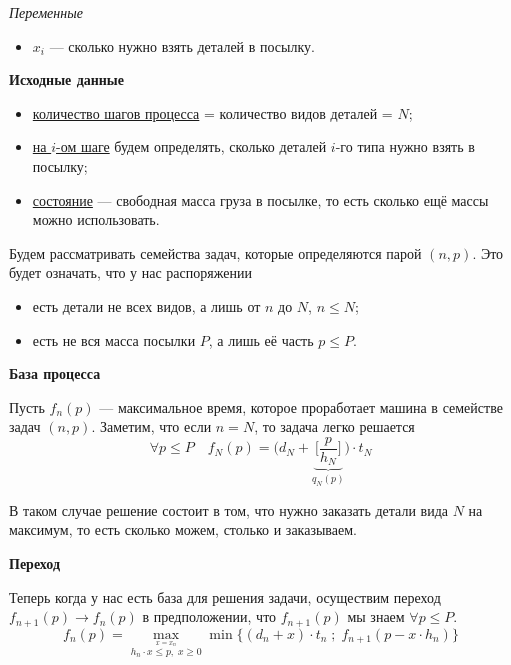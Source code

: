 \bigskip

\textit{Переменные}

\begin{itemize}[nosep]	
	\item $x_i$ --- сколько нужно взять деталей в посылку.
\end{itemize}

\bigskip

\textbf{Исходные данные}

\begin{itemize}[nosep]
	\item \underline{количество шагов процесса} = количество видов деталей = $N$;
	
	\item \underline{на $i$-ом шаге} будем определять, сколько деталей $i$-го типа нужно взять в посылку;
	
	\item \underline{состояние} --- свободная масса груза в посылке, то есть сколько ещё массы можно использовать.
\end{itemize}

Будем рассматривать семейства задач, которые определяются парой $(n, p)$. Это будет означать, что у нас распоряжении
\begin{itemize}[nosep]
	\item есть детали не всех видов, а лишь от $n$ до $N$, $n \le N$;
	
	\item есть не вся масса посылки $P$, а лишь её часть $p \le P$.
\end{itemize}

\bigskip

\textbf{База процесса}

Пусть $f_n(p)$ --- максимальное время, которое проработает машина в семействе задач $(n, p)$. Заметим, что если $n = N$, то задача легко решается
\[
\forall p \le P \quad f_N(p) = \bigg(d_N + \underbrace{\bigg[\frac{p}{h_N}\bigg]}_{q_N(p)}\bigg) \cdot t_N
\]

В таком случае решение состоит в том, что нужно заказать детали вида $N$ на максимум, то есть сколько можем, столько и заказываем.

\bigskip

\textbf{Переход}

Теперь когда у нас есть база для решения задачи, осуществим переход $f_{n+1}(p) \to f_n(p)$ в предположении, что $f_{n+1}(p)$ мы знаем $\forall p \le P$.
\[
\boxed{f_n(p) = \max_{\stackrel{x = x_n}{h_n \cdot x \le p, \; x \ge 0}} \min\Big\{(d_n + x) \cdot t_n \; ; \; f_{n+1}(p - x \cdot h_n)\Big\}}
\]


